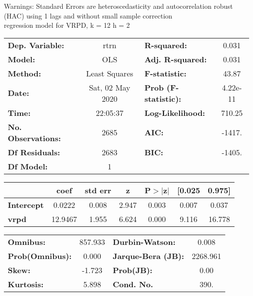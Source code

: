 Warnings: \newline
 [1] Standard Errors are heteroscedasticity and autocorrelation robust (HAC) using 1 lags and without small sample correction\\ 

regression model for VRPD, k = 12 h = 2\begin{center}
\begin{tabular}{lclc}
\toprule
\textbf{Dep. Variable:}    &       rtrn       & \textbf{  R-squared:         } &     0.031   \\
\textbf{Model:}            &       OLS        & \textbf{  Adj. R-squared:    } &     0.031   \\
\textbf{Method:}           &  Least Squares   & \textbf{  F-statistic:       } &     43.87   \\
\textbf{Date:}             & Sat, 02 May 2020 & \textbf{  Prob (F-statistic):} &  4.22e-11   \\
\textbf{Time:}             &     22:05:37     & \textbf{  Log-Likelihood:    } &    710.25   \\
\textbf{No. Observations:} &        2685      & \textbf{  AIC:               } &    -1417.   \\
\textbf{Df Residuals:}     &        2683      & \textbf{  BIC:               } &    -1405.   \\
\textbf{Df Model:}         &           1      & \textbf{                     } &             \\
\bottomrule
\end{tabular}
\begin{tabular}{lcccccc}
                   & \textbf{coef} & \textbf{std err} & \textbf{z} & \textbf{P$> |$z$|$} & \textbf{[0.025} & \textbf{0.975]}  \\
\midrule
\textbf{Intercept} &       0.0222  &        0.008     &     2.947  &         0.003        &        0.007    &        0.037     \\
\textbf{vrpd}      &      12.9467  &        1.955     &     6.624  &         0.000        &        9.116    &       16.778     \\
\bottomrule
\end{tabular}
\begin{tabular}{lclc}
\textbf{Omnibus:}       & 857.933 & \textbf{  Durbin-Watson:     } &    0.008  \\
\textbf{Prob(Omnibus):} &   0.000 & \textbf{  Jarque-Bera (JB):  } & 2268.961  \\
\textbf{Skew:}          &  -1.723 & \textbf{  Prob(JB):          } &     0.00  \\
\textbf{Kurtosis:}      &   5.898 & \textbf{  Cond. No.          } &     390.  \\
\bottomrule
\end{tabular}
\end{center}

